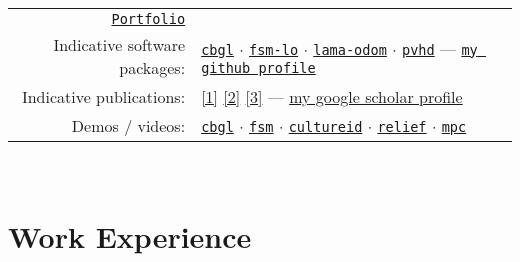 \documentclass[a4paper,10pt,twoside]{article}
\begin{document}
\vspace{+0.1cm}
\begin{tabular}{rp{12cm}}
  \href{https://raw.githubusercontent.com/li9i/portfolio/master/portfolio.pdf}{\texttt{Portfolio}} & \\

  Indicative software packages: &
\href{https://github.com/li9i/cbgl}{\texttt{cbgl}} $\cdot$
\href{https://github.com/li9i/fsm-lo}{\texttt{fsm-lo}} $\cdot$
\href{https://github.com/li9i/lama-odom}{\texttt{lama-odom}} $\cdot$
\href{https://github.com/li9i/pandora\_vision\_2014/tree/hydro-devel/pandora\_vision\_hole\_detector}{\texttt{pvhd}} --- \href{https://github.com/li9i}{\texttt{my github profile}}\\

  Indicative publications: &
\href{https://ieeexplore.ieee.org/abstract/document/9981228}{[1]}
\href{https://www.sciencedirect.com/science/article/abs/pii/S0921889021002323}{[2]}
\href{https://www.tandfonline.com/doi/full/10.1080/00207179.2018.1514129}{[3]} --- \href{https://scholar.google.com/citations?view\_op=list\_works\&hl=en\&user=9\_hI4hMAAAAJ}{my google scholar profile}\\

  Demos / videos: & \href{https://www.youtube.com/watch?v=xaDKjI0WkDc}{\texttt{cbgl}} $\cdot$ \href{https://www.youtube.com/watch?v=hB4qsHCEXGI}{\texttt{fsm}} $\cdot$ \href{https://cultureid.web.auth.gr/?page\_id=200&lang=en}{\texttt{cultureid}} $\cdot$ \href{https://relief.web.auth.gr/}{\texttt{relief}} $\cdot$ \href{https://www.youtube.com/watch?v=937OZez1iN8}{\texttt{mpc}}
\end{tabular}\\


\section{Work Experience}
\end{document}
